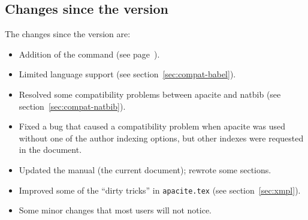 \documentclass{article}
\newcommand{\APACversiondate}[1]{\relax [#1]}
\newcommand{\pkg}[1]{\textsf{#1}}%
\newcommand{\fname}[1]{\texttt{#1}}%
\newcommand{\cmd}[1]{\texttt{\string#1}}%
\begin{document}
\subsection*{Changes since the \APACversiondate{2004/07/01} version}
The changes since the \APACversiondate{2004/07/01} version are:
\begin{itemize}
\item Addition of the \cmd{\BBYY} command (see page~\pageref{cmd:BBYY}).
\item Limited language support (see section~\ref{sec:compat-babel}).
\item Resolved some compatibility problems between \pkg{apacite} and
      \pkg{natbib} (see section~\ref{sec:compat-natbib}).
\item Fixed a bug that caused a compatibility problem when \pkg{apacite}
      was used without one of the author indexing options, but other
      indexes were requested in the document.
\item Updated the manual (the current document); rewrote some sections.
\item Improved some of the ``dirty tricks'' in \fname{apacite.tex}
      (see section~\ref{sec:xmpl}).
\item Some minor changes that most users will not notice.
\end{itemize}

\end{document}
